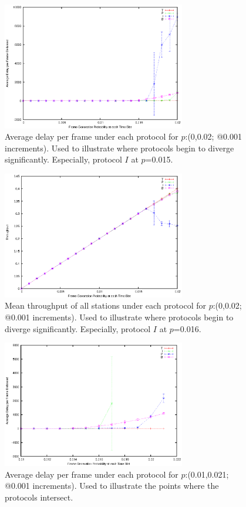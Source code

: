 \documentclass[twocolumn]{article}
\begin{document}
\begin{figure}
    \centering
    \includegraphics[width=8cm]{plots/ib_diverge_delay.eps}
    \caption{\footnotesize Average delay per frame under each protocol for $p$:(0,0.02; @0.001 increments). Used to illustrate where protocols begin to diverge significantly. Especially, protocol $I$ at $p$=0.015.}
    \label{fig:delay_ib}
\end{figure}

\begin{figure}
    \centering
    \includegraphics[width=8cm]{plots/ib_diverge_throughput.eps}
    \caption{\footnotesize Mean throughput of all stations under each protocol for $p$:(0,0.02; @0.001 increments). Used to illustrate where protocols begin to diverge significantly. Especially, protocol $I$ at $p$=0.016.}
    \label{fig:throughput_ib}
\end{figure}

\begin{figure}
    \centering
    \includegraphics[width=8cm]{plots/tpbi_delay.eps}
    \caption{\footnotesize Average delay per frame under each protocol for $p$:(0.01,0.021; @0.001 increments). Used to illustrate the points where the protocols intersect.}
    \label{fig:delay_diverging}
\end{figure}
\end{document}
